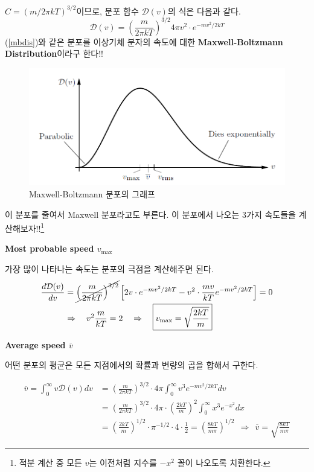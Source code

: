 \documentclass{article}
\begin{document}
$C = (m/2\pi kT)^{3/2}$이므로, 분포 함수 $\mathcal{D}(v)$의 식은 다음과 같다.
\begin{equation}\label{mbdis}
    \boxed{\mathcal{D}(v) = \left( \frac{m}{2\pi k T} \right)^{3/2} 4\pi v^2 \cdot e^{-mv^2/2kT}}
\end{equation}
(\ref{mbdis})와 같은 분포를 이상기체 분자의 속도에 대한 \textbf{Maxwell-Boltzmann Distribution}이라구 한다!! 

\begin{figure}[h]
    \centering
    \includegraphics[width=0.65\linewidth]{images/fig4_3.png}
    \caption{Maxwell-Boltzmann 분포의 그래프}
\end{figure}

이 분포를 줄여서 Maxwell 분포라고도 부른다. 이 분포에서 나오는 3가지 속도들을 계산해보자!!\footnote{적분 계산 중 모든 $v$는 이전처럼 지수를 $-x^2$ 꼴이 나오도록 치환한다.}

\vspace{3mm} \noindent
\textbf{Most probable speed $v_{\text{max}}$}

가장 많이 나타나는 속도는 분포의 극점을 계산해주면 된다.
\begin{align} \nonumber
    \frac{d\mathcal{D} (v)}{dv} &= \cancel{\left( \frac{m}{2\pi k T} \right)^{3/2}} \left[ 2v \cdot e^{-mv^2/2kT} - v^2 \cdot \frac{mv}{kT} e^{-mv^2/2kT} \right] = 0\\
    &\Rightarrow \quad v^2 \frac{m}{kT} = 2 \quad \Rightarrow \quad \boxed{v_{\text{max}} = \sqrt{\frac{2kT}{m}}}
\end{align}

\noindent
\textbf{Average speed $\overline{v}$}

어떤 분포의 평균은 모든 지점에서의 확률과 변량의 곱을 합해서 구한다.

\begin{align} \nonumber
    \overline{v} = \int_0^\infty v \mathcal{D}(v) dv &= \left( \frac{m}{2\pi k T} \right)^{3/2} \cdot 4\pi \int_0^\infty v^3 e^{-mv^2/2kT} dv\\ \nonumber
    &= \left( \frac{m}{2\pi k T} \right)^{3/2} \cdot 4\pi \cdot \left( \frac{2kT}{m} \right)^2 \int_0^\infty x^3 e^{-x^2}dx\\
    &= \left( \frac{2kT}{m} \right)^{1/2} \cdot \pi^{-1/2} \cdot 4 \cdot \frac12 = \left( \frac{8kT}{m\pi} \right)^{1/2} \ \ \Rightarrow \ \ \boxed{\overline{v} = \sqrt{\frac{8kT}{m\pi}}}
\end{align}
\end{document}

